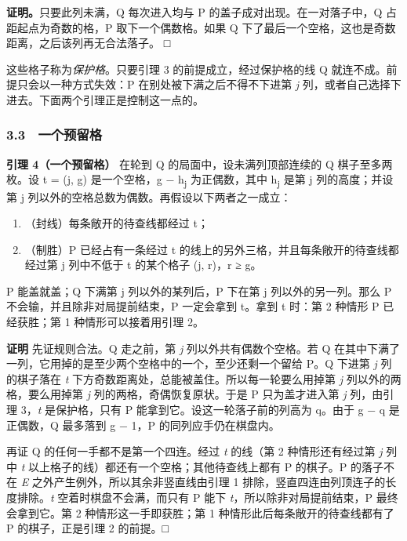 \documentclass[
  a4paper,
]{article}
\providecommand{\tightlist}{%
  \setlength{\itemsep}{0pt}\setlength{\parskip}{0pt}}
\begin{document}
\textbf{证明。}只要此列未满，Q 每次进入均与 P
的盖子成对出现。在一对落子中，Q 占距起点为奇数的格，P
取下一个偶数格。如果 Q
下了最后一个空格，这也是奇数距离，之后该列再无合法落子。 □

这些格子称为\emph{保护格}。只要引理 3 的前提成立，经过保护格的线 Q
就连不成。前提只会以一种方式失效：P 在别处被下满之后不得不下进第
\emph{j} 列，或者自己选择下进去。下面两个引理正是控制这一点的。

\subsubsection{3.3 一个预留格}\label{ux4e00ux4e2aux9884ux7559ux683c}

\textbf{引理 4（一个预留格）} 在轮到 Q 的局面中，设未满列顶部连续的 Q
棋子至多两枚。设 t = (j, g) 是一个空格，g − h\textsubscript{j}
为正偶数，其中 h\textsubscript{j} 是第 j 列的高度；并设第 j
列以外的空格总数为偶数。再假设以下两者之一成立：

\begin{enumerate}
\def\labelenumi{\arabic{enumi}.}
\tightlist
\item
  （封线）每条敞开的待查线都经过 t；
\item
  （制胜）P 已经占有一条经过 t
  的线上的另外三格，并且每条敞开的待查线都经过第 j 列中不低于 t
  的某个格子 (j, r)，r ≥ g。
\end{enumerate}

P 能盖就盖；Q 下满第 j 列以外的某列后，P 下在第 j 列以外的另一列。那么 P
不会输，并且除非对局提前结束，P 一定会拿到 t。拿到 t 时：第 2 种情形 P
已经获胜；第 1 种情形可以接着用引理 2。

\textbf{证明} 先证规则合法。Q 走之前，第 \emph{j}
列以外共有偶数个空格。若 Q
在其中下满了一列，它用掉的是至少两个空格中的一个，至少还剩一个留给 P。Q
下进第 \emph{j} 列的棋子落在 \emph{t}
下方奇数距离处，总能被盖住。所以每一轮要么用掉第 \emph{j}
列以外的两格，要么用掉第 \emph{j} 列的两格，奇偶恢复原状。于是 P
只为盖才进入第 \emph{j} 列，由引理 3，\emph{t} 是保护格，只有 P
能拿到它。设这一轮落子前的列高为 q。由于 g − q 是正偶数，Q 最多落到 g −
1，P 的同列应手仍在棋盘内。

再证 Q 的任何一手都不是第一个四连。经过 \emph{t} 的线（第 2
种情形还有经过第 \emph{j} 列中 \emph{t}
以上格子的线）都还有一个空格；其他待查线上都有 P 的棋子。P 的落子不在
\emph{E} 之外产生例外，所以其余非竖直线由引理 1
排除，竖直四连由列顶连子的长度排除。\emph{t} 空着时棋盘不会满，而只有 P
能下 \emph{t}，所以除非对局提前结束，P 最终会拿到它。第 2
种情形这一手即获胜；第 1 种情形此后每条敞开的待查线都有了 P
的棋子，正是引理 2 的前提。□
\end{document}
